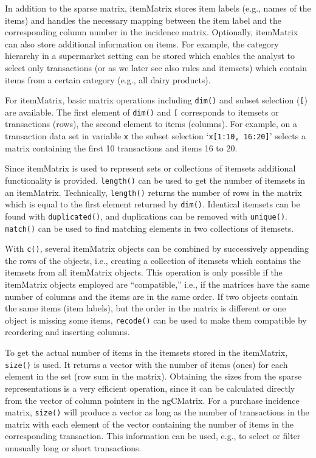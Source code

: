\documentclass[10pt,a4paper]{article}
\newcommand{\strong}[1]{{\normalfont\fontseries{b}\selectfont #1}}
\newcommand{\class}[1]{\mbox{\textsf{#1}}}
\newcommand{\func}[1]{\mbox{\texttt{#1()}}}
\newcommand{\code}[1]{\mbox{\texttt{#1}}}
\newcommand{\pkg}[1]{\strong{#1}}
\newcommand{\samp}[1]{`\mbox{\texttt{#1}}'}
\begin{document}
In addition to the sparse matrix, \class{itemMatrix} stores item labels
(e.g., names of the items) and handles the necessary mapping between the
item label and the corresponding column number in the incidence matrix.
Optionally, \class{itemMatrix} can also store additional information on
items.  For example, the category hierarchy in a supermarket setting can
be stored which enables the analyst to select only transactions (or as
we later see also rules and itemsets) which contain items from a certain
category (e.g., all dairy products).

For \class{itemMatrix}, basic matrix operations including \func{dim} and
subset selection (\code{[}) are available.  The first element of
\func{dim} and \code{[} corresponds to itemsets or transactions (rows),
the second element to items (columns).  For example, on a transaction
data set in variable \code{x} the subset selection \samp{x[1:10, 16:20]}
selects a matrix containing the first 10 transactions and items 16 to
20.

Since \class{itemMatrix} is used to represent sets 
or collections of itemsets additional functionality is provided.
\func{length} can be used to get the number of itemsets in an
\class{itemMatrix}.
Technically, \func{length} returns the number of rows in the matrix
which is equal to the first element returned by \func{dim}.
Identical itemsets can be found with \func{duplicated}, and duplications
can be removed with \func{unique}.  \func{match} can be used to find
matching elements in two collections of itemsets.

With \func{c}, several \class{itemMatrix} objects can be combined by
successively appending the rows of the objects, i.e., creating a
collection of itemsets which contains the itemsets from all
\class{itemMatrix} objects.  This operation is only possible if the
\class{itemMatrix} objects employed are ``compatible,'' i.e., if the
matrices have the same number of columns and the items are in the same
order.  If two objects contain the same items (item labels), but the
order in the matrix is different or one object is missing some items,
\func{recode} can be used to make them compatible by reordering and
inserting columns.


To get the actual number of items in the itemsets stored in the
\class{itemMatrix}, \func{size} is used.  It returns a vector with the
number of items (ones) for each element in the set (row sum in the
matrix).  Obtaining the sizes from the sparse representations is a very
efficient operation, since it can be calculated directly from the vector
of column pointers in the \class{ngCMatrix}.  For a purchase incidence
matrix, \func{size} will produce a vector as long as the number of
transactions in the matrix with each element of the vector containing
the number of items in the corresponding transaction.  This information
can be used, e.g., to select or filter unusually long or short
transactions.
\end{document}
